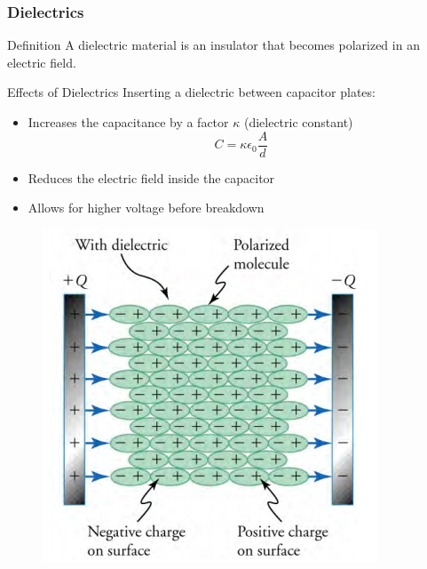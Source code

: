 \documentclass{beamer}
\begin{document}
\begin{frame}
    \frametitle{Dielectrics}
    \begin{block}{Definition}
        A dielectric material is an insulator that becomes polarized in an electric field.
    \end{block}
    
    \begin{block}{Effects of Dielectrics}
        Inserting a dielectric between capacitor plates:
        \begin{itemize}
            \item Increases the capacitance by a factor $\kappa$ (dielectric constant)
            \begin{equation}
                C = \kappa \epsilon_0 \frac{A}{d}
            \end{equation}
            \item Reduces the electric field inside the capacitor
            \item Allows for higher voltage before breakdown
        \end{itemize}
    \end{block}
    \end{frame}

\begin{frame}
    
      \begin{figure}
          \centering
          \includegraphics[width=0.7\linewidth]{phys11-electrostatics-dielectric-polarization.png}
      \end{figure}
    
\end{frame}
\end{document}
